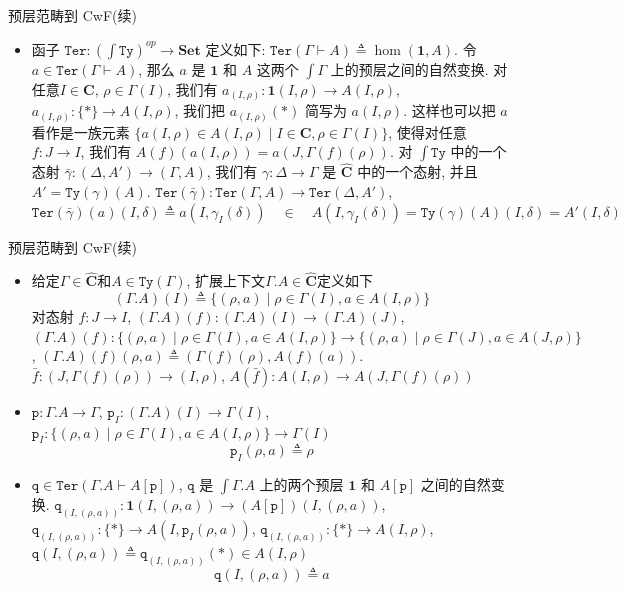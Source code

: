\documentclass[aspectratio=169,xcolor=dvipsnames]{beamer}
\newcommand\Ty{\mathtt{Ty}}
\newcommand\Ter{\mathtt{Ter}}
\newcommand\ttp{\mathtt{p}}
\newcommand\ttq{\mathtt{q}}
\newcommand\bfone{\mathbf{1}}
\newcommand\Set{\mathbf{Set}}
\newcommand\C{\mathbf{C}}
\newcommand\hatC{\widehat{\mathbf{C}}}
\begin{document}
\begin{frame}[shrink]{预层范畴到 CwF(续)}
\begin{itemize}
  \item 函子 $\Ter:(\int\Ty)^{op}\to\Set$ 定义如下: $\Ter(\Gamma\vdash A)\triangleq\hom(\bfone,A)$. 令 $a\in\Ter(\Gamma\vdash A)$, 那么 $a$ 是 $\bfone$ 和 $A$ 这两个 $\int\Gamma$ 上的预层之间的自然变换. 对任意$I\in\C$, $\rho\in\Gamma(I)$, 我们有 $a_{(I,\rho)} : \bfone(I,\rho) \to A(I,\rho)$, $a_{(I,\rho)} : \{\ast\} \to A(I,\rho)$, 我们把 $a_{(I,\rho)}(\ast)$ 简写为 $a(I,\rho)$. 这样也可以把 $a$ 看作是一族元素 $\{a(I,\rho)\in A(I,\rho) \mid I\in\C, \rho\in\Gamma(I)\}$, 使得对任意 $f:J\to I$, 我们有 $A(f)(a(I,\rho)) = a(J,\Gamma(f)(\rho))$. 对 $\int\Ty$ 中的一个态射 $\bar{\gamma}:(\Delta,A')\to(\Gamma,A)$, 我们有 $\gamma:\Delta \to \Gamma$ 是 $\hatC$ 中的一个态射, 并且 $A'=\Ty(\gamma)(A)$. $\Ter(\bar{\gamma}) : \Ter(\Gamma,A) \to \Ter(\Delta,A')$, $\Ter(\bar{\gamma})(a)(I,\delta)\triangleq a(I,\gamma_{I}(\delta))\quad\in\quad A(I,\gamma_{I}(\delta))=\Ty(\gamma)(A)(I,\delta)=A'(I,\delta)$
\end{itemize}
\end{frame}

\begin{frame}[shrink]{预层范畴到 CwF(续)}
\begin{itemize}
  \item 给定$\Gamma\in\hatC$和$A\in\Ty(\Gamma)$, 扩展上下文$\Gamma.A\in\hatC$定义如下
  \[ (\Gamma.A)(I) \triangleq \{ (\rho,a) \mid \rho \in \Gamma(I), a \in A(I,\rho) \} \]
  对态射 $f : J \to I$, $(\Gamma.A)(f) : (\Gamma.A)(I) \to (\Gamma.A)(J)$, $(\Gamma.A)(f) : \{(\rho,a) \mid \rho \in \Gamma(I), a \in A(I,\rho) \} \to \{(\rho,a) \mid \rho \in \Gamma(J), a \in A(J,\rho) \}$, $(\Gamma.A)(f)(\rho,a)\triangleq (\Gamma(f)(\rho),A(f)(a))$. $\bar{f} : (J,\Gamma(f)(\rho)) \to (I,\rho)$, $A(\bar{f}) : A(I,\rho) \to A(J,\Gamma(f)(\rho))$
  \item $\ttp : \Gamma.A \to \Gamma$, $\ttp_I : (\Gamma.A)(I) \to \Gamma(I)$, $\ttp_I : \{ (\rho,a) \mid \rho \in \Gamma(I), a \in A(I,\rho) \} \to \Gamma(I)$
  \[ \ttp_I(\rho,a) \triangleq \rho \]
  \item $\ttq \in \Ter(\Gamma.A \vdash A[\ttp])$, $\ttq$ 是 $\int\Gamma.A$ 上的两个预层 $\bfone$ 和 $A[\ttp]$ 之间的自然变换. $\ttq_{(I,(\rho,a))} : \bfone(I,(\rho,a)) \to (A[\ttp])(I,(\rho,a))$, $\ttq_{(I,(\rho,a))} : \{\ast\} \to A(I,\ttp_I(\rho,a))$, $\ttq_{(I,(\rho,a))} : \{\ast\} \to A(I,\rho)$, $\ttq(I,(\rho,a)) \triangleq \ttq_{(I,(\rho,a))}(\ast) \in A(I,\rho)$
  \[ \ttq(I,(\rho,a)) \triangleq a \]
\end{itemize}
\end{frame}
\end{document}
